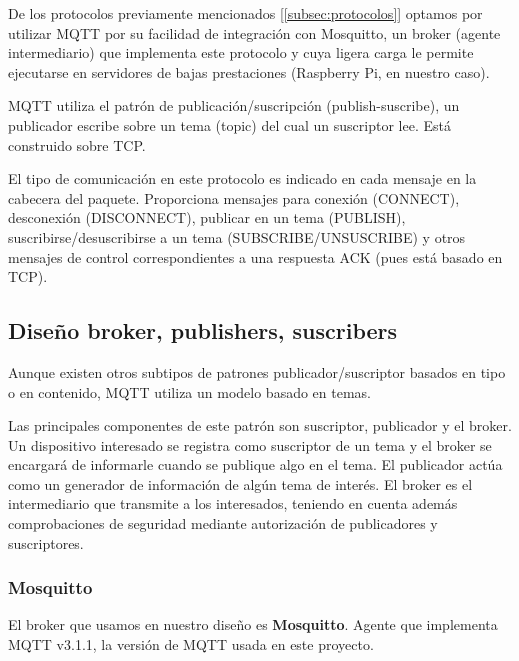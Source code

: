 \documentclass[a4paper,10pt]{article}
\begin{document}
De los protocolos previamente mencionados [\ref{subsec:protocolos}]
optamos por utilizar MQTT por su facilidad de integración con
Mosquitto, un broker (agente intermediario) que implementa este
protocolo y cuya ligera carga le permite ejecutarse en servidores de
bajas prestaciones (Raspberry Pi, en nuestro caso).

MQTT utiliza el patrón de publicación/suscripción (publish-suscribe),
un publicador escribe sobre un tema (topic) del cual un suscriptor
lee. Está construido sobre TCP.

El tipo de comunicación en este protocolo es indicado en cada mensaje
en la cabecera del paquete. Proporciona mensajes para conexión
(CONNECT), desconexión (DISCONNECT), publicar en un tema (PUBLISH),
suscribirse/desuscribirse a un tema (SUBSCRIBE/UNSUSCRIBE) y otros
mensajes de control correspondientes a una respuesta ACK (pues está
basado en TCP)\cite{banksMQTTVersionEdited}.

\subsection{Diseño broker, publishers,
suscribers}\label{diseuxf1o-broker-publishers-suscribers}

Aunque existen otros subtipos de patrones publicador/suscriptor
basados en tipo o en contenido\cite{p.th.eugsterManyFacesPublish},
MQTT utiliza un modelo basado en temas.

Las principales componentes de este patrón son suscriptor, publicador
y el broker. Un dispositivo interesado se registra como suscriptor de
un tema y el broker se encargará de informarle cuando se publique algo
en el tema. El publicador actúa como un generador de información de
algún tema de interés. El broker es el intermediario que transmite a
los interesados, teniendo en cuenta además comprobaciones de seguridad
mediante autorización de publicadores y
suscriptores.\cite{al-fuqahaInternetThingsSurvey2015,hunkelerMQTTSPublishSubscribe2008}

\subsubsection{Mosquitto}

El broker que usamos en nuestro diseño es
\textbf{Mosquitto}\cite{EclipseMosquitto}. Agente que implementa MQTT
v3.1.1, la versión de MQTT usada en este proyecto.

\newpage


 
\end{document}
